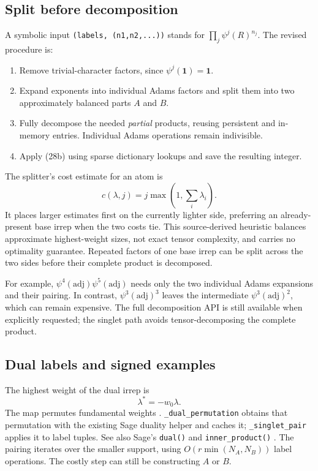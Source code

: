 \documentclass[11pt,a4paper]{article}
\newcommand{\code}[1]{{\small\nolinkurl{#1}}}
\newcommand{\adj}{\mathrm{adj}}
\begin{document}
\clearpage
\subsection{Split before decomposition}
A symbolic input \code{(labels, (n1,n2,...))} stands for
$\prod_j\psi^j(R)^{n_j}$. The revised procedure is:
\begin{enumerate}
\item Remove trivial-character factors, since $\psi^j(\mathbf1)=\mathbf1$.
\item Expand exponents into individual Adams factors and split them into two
approximately balanced parts $A$ and $B$.
\item Fully decompose the needed \emph{partial} products, reusing persistent and
in-memory entries. Individual Adams operations remain indivisible.
\item Apply (28b) using sparse dictionary lookups and save the resulting integer.
\end{enumerate}
The splitter's cost estimate for an atom is
\begin{equation*}
 c(\lambda,j)=j\max\left(1,\sum_i\lambda_i\right).
 \tag{28c}
\end{equation*}
It places larger estimates first on the currently lighter side, preferring an
already-present base irrep when the two costs tie. This source-derived heuristic
balances approximate highest-weight sizes, not exact tensor complexity, and
carries no optimality guarantee. Repeated factors of one base irrep can be split
across the two sides before their complete product is decomposed.

For example, $\psi^4(\adj)\psi^5(\adj)$ needs only the two individual Adams
expansions and their pairing. In contrast, $\psi^3(\adj)^3$ leaves the intermediate
$\psi^3(\adj)^2$, which can remain expensive. The full decomposition API is still
available when explicitly requested; the singlet path avoids tensor-decomposing
the complete product.

\subsection{Dual labels and signed examples}
The highest weight of the dual irrep is
\begin{equation*}
 \lambda^*=-w_0\lambda.\tag{28d}
\end{equation*}
The map permutes fundamental weights \cite[Prop.~32.1]{etingof}.
\code{_dual_permutation} obtains that permutation with the existing Sage duality
helper and caches it; \code{_singlet_pair} applies it to label tuples.
See also Sage's \code{dual()} and \code{inner_product()} \cite{sage}.
The pairing iterates over the smaller support, using $O(r\min(N_A,N_B))$ label
operations. The costly step can still be constructing $A$ or $B$.
\end{document}
